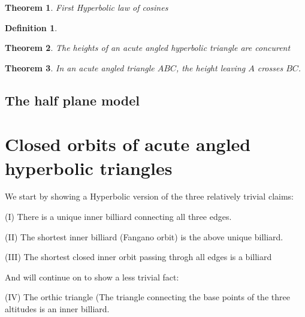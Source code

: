\documentclass[a4paper,10pt]{article}
\newtheorem{theorem}{Theorem}[section]
\newtheorem{definition}{Definition}[section]
\begin{document}
\label{cosine2}
\begin{theorem}
First Hyperbolic law of cosines
\end{theorem}

\label{hyperbolicheightexistance}
\begin{definition}

\end{definition}



\label{hyperbolicheights2}
\begin{theorem}
The heights of an acute angled hyperbolic triangle are concurent
\end{theorem}

\label{hyperbolicheights2}
\begin{theorem}
In an acute angled triangle $ABC$, the height leaving $A$ crosses $BC$.
\end{theorem}

\subsection{The half plane model}

\section{Closed orbits of acute angled hyperbolic triangles}

We start by showing a Hyperbolic version of the three relatively trivial claims:

(I) There is a unique inner billiard connecting all three edges.

(II) The shortest inner billiard (Fangano orbit) is the above unique billiard.

(III) The shortest closed inner orbit passing throgh all edges is a billiard

And will continue on to show a less trivial fact:

(IV) The orthic triangle (The triangle connecting the base points of the 
three altitudes is an inner billiard.
\end{document}
